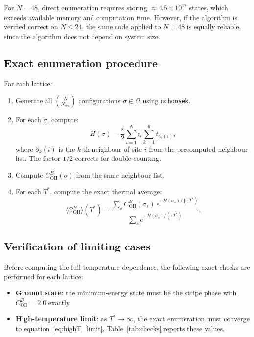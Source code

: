 \documentclass[12pt, a4paper]{article}
\theoremstyle{plain}
\theoremstyle{definition}
\newcommand{\COH}{C_\mathrm{OH}^B}
\newcommand{\eps}{\varepsilon}
\newcommand{\Nocc}{N_\mathrm{occ}}
\newcommand{\Tstar}{T^*}
\newcommand{\avgE}[1]{\langle #1 \rangle}
\begin{document}
For $N=48$, direct enumeration requires storing
$\approx 4.5\times10^{12}$ states, which exceeds available
memory and computation time.
However, if the algorithm is verified correct on $N\leq 24$,
the same code applied to $N=48$ is equally reliable,
since the algorithm does not depend on system size.

\subsection{Exact enumeration procedure}

For each lattice:
\begin{enumerate}
    \item Generate all $\binom{N}{\Nocc}$ configurations
          $\sigma \in \Omega$ using \texttt{nchoosek}.
    \item For each $\sigma$, compute:
          \[
              H(\sigma) = \frac{\eps}{2}
              \sum_{i=1}^{N} t_i \sum_{k=1}^{6}
              t_{\partial_k(i)},
          \]
          where $\partial_k(i)$ is the $k$-th neighbour of site
          $i$ from the precomputed neighbour list.
          The factor $1/2$ corrects for double-counting.
    \item Compute $\COH(\sigma)$ from the same neighbour list.
    \item For each $\Tstar$, compute the exact thermal average:
          \[
              \avgE{\COH}(\Tstar)
              = \frac{\sum_s \COH(\sigma_s)\,
                      e^{-H(\sigma_s)/(\eps\Tstar)}}
                     {\sum_s e^{-H(\sigma_s)/(\eps\Tstar)}}.
          \]
\end{enumerate}

\subsection{Verification of limiting cases}

Before computing the full temperature dependence, the following
exact checks are performed for each lattice:

\begin{itemize}
    \item \textbf{Ground state}: the minimum-energy state must
          be the stripe phase with $\COH = 2.0$ exactly.
    \item \textbf{High-temperature limit}: as $\Tstar\to\infty$,
          the exact enumeration must converge to
          equation~\eqref{eq:highT_limit}.
          Table~\ref{tab:checks} reports these values.
\end{itemize}
\end{document}
